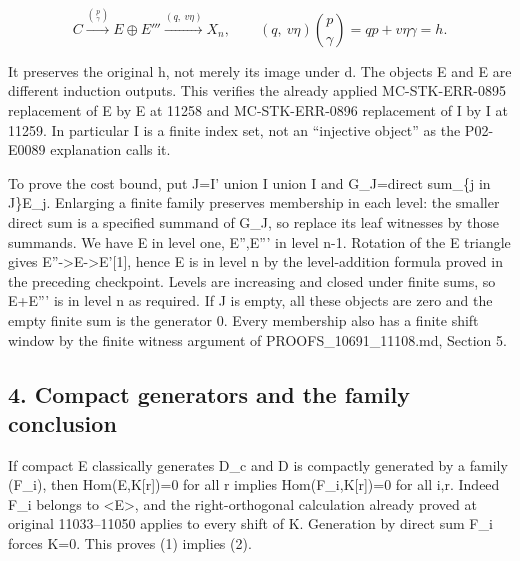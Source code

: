\[
 C\xrightarrow{\binom p\gamma}E\oplus E'''
       \xrightarrow{(q,\ v\eta)}X_n,
 \qquad (q,\ v\eta)\binom p\gamma=qp+v\eta\gamma=h.
\]

It preserves the original h,\allowbreak{} not merely its image under d. The objects E\textquotesingle\textquotesingle{} and E\textquotesingle\textquotesingle\textquotesingle{} are different induction outputs. This verifies the already applied MC-STK-ERR-0895 replacement of E\textquotesingle\textquotesingle{} by E\textquotesingle\textquotesingle\textquotesingle{} at 11258 and MC-STK-ERR-0896 replacement of I\textquotesingle{} by I\textquotesingle\textquotesingle\textquotesingle{} at 11259. In particular I\textquotesingle\textquotesingle\textquotesingle{} is a finite index set,\allowbreak{} not an ``injective object'' as the P02-E0089 explanation calls it.

To prove the cost bound,\allowbreak{} put J\allowbreak{}=I' union I\textquotesingle\textquotesingle{} union I\textquotesingle\textquotesingle\textquotesingle{} and G\_\allowbreak{}J\allowbreak{}=direct sum\_\allowbreak{}\{j in J\}E\_\allowbreak{}j. Enlarging a finite family preserves membership in each level:\allowbreak{} the smaller direct sum is a specified summand of G\_\allowbreak{}J,\allowbreak{} so replace its leaf witnesses by those summands. We have E\textquotesingle{} in level one,\allowbreak{} E'',\allowbreak{}E''' in level n-1. Rotation of the E triangle gives E''\allowbreak{}->E\allowbreak{}->E'[1]\allowbreak{},\allowbreak{} hence E is in level n by the level-addition formula proved in the preceding checkpoint. Levels are increasing and closed under finite sums,\allowbreak{} so E\allowbreak{}+E''' is in level n as required. If J is empty,\allowbreak{} all these objects are zero and the empty finite sum is the generator 0. Every membership also has a finite shift window by the finite witness argument of PROOFS\_\allowbreak{}10691\_\allowbreak{}11108.md,\allowbreak{} Section 5.

\subsection{4. Compact generators and the family conclusion}\label{proofs-11121-11450-compact-generators-and-the-family-conclusion}

If compact E classically generates D\_\allowbreak{}c and D is compactly generated by a family (F\_\allowbreak{}i)\allowbreak{},\allowbreak{} then Hom(E,\allowbreak{}K[r]\allowbreak{})\allowbreak{}\allowbreak{}=0 for all r implies Hom(F\_\allowbreak{}i,\allowbreak{}K[r]\allowbreak{})\allowbreak{}\allowbreak{}=0 for all i,\allowbreak{}r. Indeed F\_\allowbreak{}i belongs to <E>,\allowbreak{} and the right-orthogonal calculation already proved at original 11033–\allowbreak{}11050 applies to every shift of K. Generation by direct sum F\_\allowbreak{}i forces K\allowbreak{}=0. This proves (1)\allowbreak{} implies (2)\allowbreak{}.

